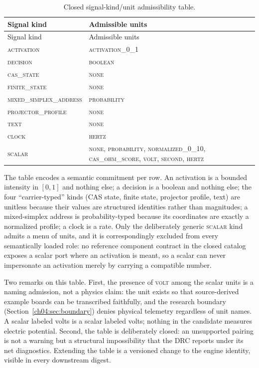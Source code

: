 \begin{longtable}{@{}lp{7.2cm}@{}}
\caption{Closed signal-kind/unit admissibility table.}
\label{ch04:tab:sigunit}\\
\toprule
Signal kind & Admissible units \\
\midrule
\endfirsthead
\toprule
Signal kind & Admissible units \\
\midrule
\endhead
\bottomrule
\endfoot
\textsc{activation} & \textsc{activation\_0\_1} \\
\textsc{decision} & \textsc{boolean} \\
\textsc{cas\_state} & \textsc{none} \\
\textsc{finite\_state} & \textsc{none} \\
\textsc{mixed\_simplex\_address} & \textsc{probability} \\
\textsc{projector\_profile} & \textsc{none} \\
\textsc{text} & \textsc{none} \\
\textsc{clock} & \textsc{hertz} \\
\textsc{scalar} & \textsc{none}, \textsc{probability},
\textsc{normalized\_0\_10}, \textsc{cas\_ohm\_score}, \textsc{volt},
\textsc{second}, \textsc{hertz} \\
\end{longtable}

The table encodes a semantic commitment per row. An activation is a
bounded intensity in $[0,1]$ and nothing else; a decision is a boolean and
nothing else; the four ``carrier-typed'' kinds (CAS state, finite state,
projector profile, text) are unitless because their values are structured
identities rather than magnitudes; a mixed-simplex address is
probability-typed because its coordinates are exactly a normalized
profile; a clock is a rate. Only the deliberately generic \textsc{scalar}
kind admits a menu of units, and it is correspondingly excluded from every
semantically loaded role: no reference component contract in the closed
catalog exposes a scalar port where an activation is meant, so a scalar
can never impersonate an activation merely by carrying a compatible
number.

Two remarks on this table. First, the presence of \textsc{volt} among the
scalar units is a naming admission, not a physics claim: the unit exists so
that source-derived example boards can be transcribed faithfully, and the
research boundary (Section~\ref{ch04:sec:boundary}) denies physical
telemetry regardless of unit names. A scalar labeled volts is a scalar
labeled volts; nothing in the candidate measures electric potential.
Second, the table is deliberately closed: an unsupported pairing is not a
warning but a structural impossibility that the DRC reports under its net
diagnostics. Extending the table is a versioned change to the engine
identity, visible in every downstream digest.

